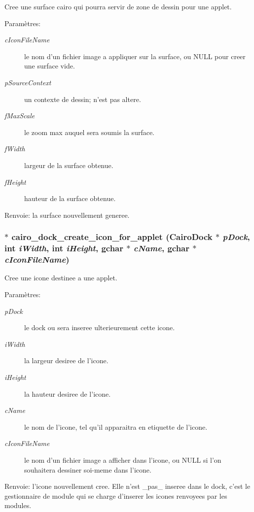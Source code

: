 Cree une surface cairo qui pourra servir de zone de dessin pour une applet. \begin{Desc}
\item[Paramètres:]
\begin{description}
\item[{\em cIconFileName}]le nom d'un fichier image a appliquer sur la surface, ou NULL pour creer une surface vide. \item[{\em pSourceContext}]un contexte de dessin; n'est pas altere. \item[{\em fMaxScale}]le zoom max auquel sera soumis la surface. \item[{\em fWidth}]largeur de la surface obtenue. \item[{\em fHeight}]hauteur de la surface obtenue. \end{description}
\end{Desc}
\begin{Desc}
\item[Renvoie:]la surface nouvellement generee. \end{Desc}
\subsubsection{$\ast$ cairo\_\-dock\_\-create\_\-icon\_\-for\_\-applet ({\bf CairoDock} $\ast$ {\em pDock}, int {\em iWidth}, int {\em iHeight}, gchar $\ast$ {\em cName}, gchar $\ast$ {\em cIconFileName})}\label{cairo-dock-applet-factory_8h_f4d7d3330b8bb296422c34b51db7094c}


Cree une icone destinee a une applet. \begin{Desc}
\item[Paramètres:]
\begin{description}
\item[{\em pDock}]le dock ou sera inseree ulterieurement cette icone. \item[{\em iWidth}]la largeur desiree de l'icone. \item[{\em iHeight}]la hauteur desiree de l'icone. \item[{\em cName}]le nom de l'icone, tel qu'il apparaitra en etiquette de l'icone. \item[{\em cIconFileName}]le nom d'un fichier image a afficher dans l'icone, ou NULL si l'on souhaitera dessiner soi-meme dans l'icone. \end{description}
\end{Desc}
\begin{Desc}
\item[Renvoie:]l'icone nouvellement cree. Elle n'est \_\-pas\_\- inseree dans le dock, c'est le gestionnaire de module qui se charge d'inserer les icones renvoyees par les modules. \end{Desc}
